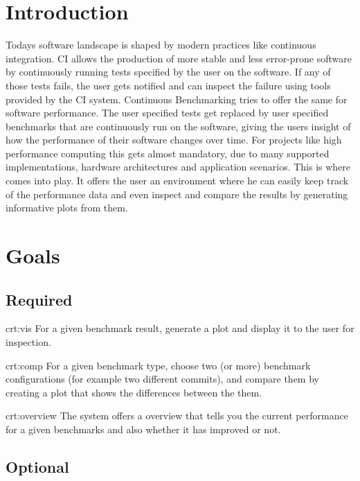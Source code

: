 \section{Introduction}

Todays software landscape is shaped by modern practices like continuous integration. CI allows the production of more stable and less error-prone software by continuously running tests specified by the user on the software. If any of those tests fails, the user gets notified and can inspect the failure using tools provided by the CI system. Continuous Benchmarking tries to offer the same for software performance. The user specified tests get replaced by user specified benchmarks that are continuously run on the software, giving the users insight of how the performance of their software changes over time. For projects like high performance computing this gets almost mandatory, due to many supported implementations, hardware architectures and application scenarios. This is where \parkview{} comes into play. It offers the user an environment where he can easily keep track of the performance data and even inspect and compare the results by generating informative plots from them.

\section{Goals}

\subsection{Required}

{crt:vis}
{For a given benchmark result, generate a \gls{plot} and display it to the user for inspection.}

{crt:comp}
{For a given benchmark type, choose two (or more) \glspl{benchmark configuration} (for example two different commits), and compare them by creating a plot that shows the differences between the them.}

{crt:overview}
{The system offers a overview that tells you the current performance for a given benchmarks and also whether it has improved or not.}

\subsection{Optional}

